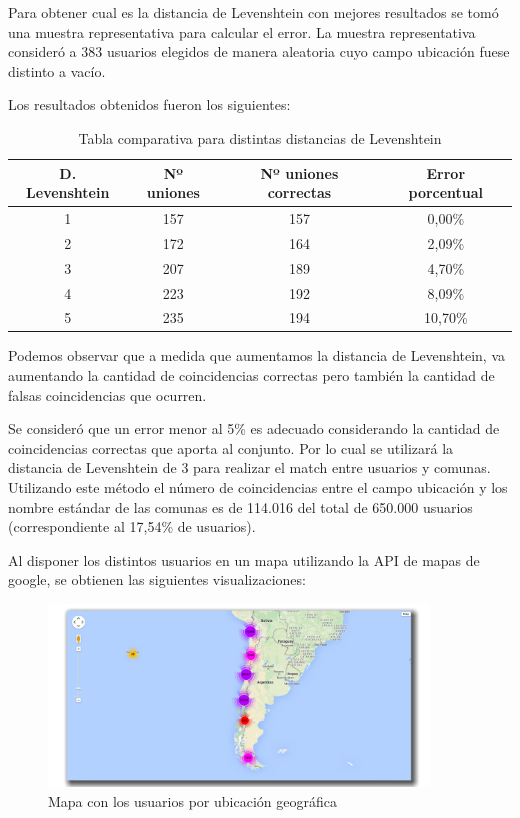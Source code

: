 Para obtener cual es la distancia de Levenshtein con mejores resultados se tomó una muestra representativa para calcular el error. La muestra representativa consideró a 383 usuarios elegidos de manera aleatoria cuyo campo ubicación fuese distinto a vacío.

Los resultados obtenidos fueron los siguientes:

\begin{table}[H]
	\centering
	\begin{tabular}{| c|c|c|c|}
		\hline
		D. Levenshtein & Nº uniones & Nº uniones correctas  &  Error porcentual \\ \hline
		1   & 157 & 157 & 0,00\% \\ \hline
		2   & 172 & 164 & 2,09\% \\ \hline
		3	& 207 & 189 & 4,70\% \\ \hline
		4	& 223 & 192 & 8,09\% \\ \hline
		5	& 235 & 194 & 10,70\% \\ \hline
	\end{tabular}
	\caption {Tabla comparativa para distintas distancias de Levenshtein}
\end{table}

Podemos observar que a medida que aumentamos la distancia de Levenshtein, va aumentando la cantidad de coincidencias correctas pero también la cantidad de falsas coincidencias que ocurren.

Se consideró que un error menor al 5\% es adecuado considerando la cantidad de coincidencias correctas que aporta al conjunto. Por lo cual se utilizará la distancia de Levenshtein de 3 para realizar el match entre usuarios y comunas. Utilizando este método el número de coincidencias entre el campo ubicación y los nombre estándar de las comunas es de 114.016 del total de 650.000 usuarios (correspondiente al 17,54\% de usuarios).

Al disponer los distintos usuarios en un mapa utilizando la API de mapas de google, se obtienen las siguientes visualizaciones:

\begin{figure}[H]
	\centering
	\includegraphics[width=0.9\textwidth]{imgs/mapa_usuarios.png}
	\caption{Mapa con los usuarios por ubicación geográfica}
	\label{fig:mapa_usuarios}
\end{figure}


